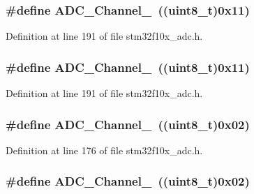 \subsubsection[{\texorpdfstring{A\+D\+C\+\_\+\+Channel\+\_\+17}{ADC_Channel_17}}]{\setlength{\rightskip}{0pt plus 5cm}\#define A\+D\+C\+\_\+\+Channel\+\_~(({\bf uint8\+\_\+t})0x11)}\hypertarget{group___a_d_c__channels_ga58cdfe3a5625f198116d163b09698cea}{}\label{group___a_d_c__channels_ga58cdfe3a5625f198116d163b09698cea}


Definition at line 191 of file stm32f10x\+\_\+adc.\+h.

\subsubsection[{\texorpdfstring{A\+D\+C\+\_\+\+Channel\+\_\+17}{ADC_Channel_17}}]{\setlength{\rightskip}{0pt plus 5cm}\#define A\+D\+C\+\_\+\+Channel\+\_~(({\bf uint8\+\_\+t})0x11)}\hypertarget{group___a_d_c__channels_ga58cdfe3a5625f198116d163b09698cea}{}\label{group___a_d_c__channels_ga58cdfe3a5625f198116d163b09698cea}


Definition at line 191 of file stm32f10x\+\_\+adc.\+h.

\subsubsection[{\texorpdfstring{A\+D\+C\+\_\+\+Channel\+\_\+2}{ADC_Channel_2}}]{\setlength{\rightskip}{0pt plus 5cm}\#define A\+D\+C\+\_\+\+Channel\+\_~(({\bf uint8\+\_\+t})0x02)}\hypertarget{group___a_d_c__channels_gabc66e2529583e11b591efd2df7070571}{}\label{group___a_d_c__channels_gabc66e2529583e11b591efd2df7070571}


Definition at line 176 of file stm32f10x\+\_\+adc.\+h.

\subsubsection[{\texorpdfstring{A\+D\+C\+\_\+\+Channel\+\_\+2}{ADC_Channel_2}}]{\setlength{\rightskip}{0pt plus 5cm}\#define A\+D\+C\+\_\+\+Channel\+\_~(({\bf uint8\+\_\+t})0x02)}\hypertarget{group___a_d_c__channels_gabc66e2529583e11b591efd2df7070571}{}\label{group___a_d_c__channels_gabc66e2529583e11b591efd2df7070571}


